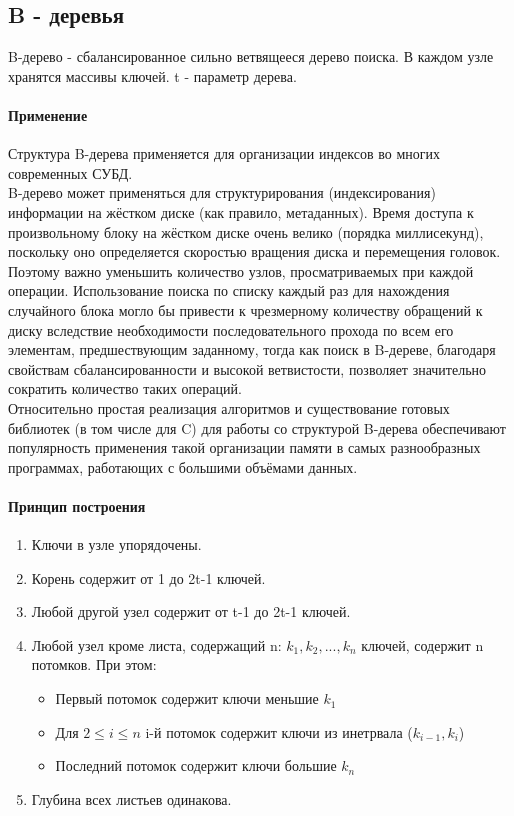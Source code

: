 \documentclass[a4paper,10pt]{article}
\begin{document}
\subsection{B - деревья}
B-дерево - сбалансированное сильно ветвящееся дерево поиска. В каждом узле хранятся массивы ключей. t - параметр дерева.
\paragraph{Применение}
Структура B-дерева применяется для организации индексов во многих современных СУБД.\\

B-дерево может применяться для структурирования (индексирования) информации на жёстком диске (как правило, метаданных). Время доступа к произвольному блоку на жёстком диске очень велико (порядка миллисекунд), поскольку оно определяется скоростью вращения диска и перемещения головок. Поэтому важно уменьшить количество узлов, просматриваемых при каждой операции. Использование поиска по списку каждый раз для нахождения случайного блока могло бы привести к чрезмерному количеству обращений к диску вследствие необходимости последовательного прохода по всем его элементам, предшествующим заданному, тогда как поиск в B-дереве, благодаря свойствам сбалансированности и высокой ветвистости, позволяет значительно сократить количество таких операций.\\

Относительно простая реализация алгоритмов и существование готовых библиотек (в том числе для C) для работы со структурой B-дерева обеспечивают популярность применения такой организации памяти в самых разнообразных программах, работающих с большими объёмами данных.\\
\paragraph{Принцип построения}
\begin{enumerate}
	\item Ключи в узле упорядочены.
	\item Корень содержит от 1 до 2t-1 ключей.
	\item Любой другой узел содержит от t-1 до 2t-1 ключей.
	\item Любой узел кроме листа, содержащий n: $k_1, k_2, ..., k_n$ ключей, содержит n потомков. При этом:
\begin{itemize}
	\item Первый потомок содержит ключи меньшие $k_1$
	\item Для $2 \leq i \leq n$ i-й потомок содержит ключи из инетрвала ($k_{i-1}, k_i$)
	\item Последний потомок содержит ключи большие $k_n$
\end{itemize}
	\item Глубина всех листьев одинакова.
\end{enumerate}
\end{document}

